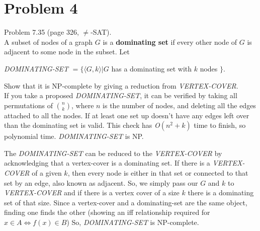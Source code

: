 \documentclass[11pt]{article}
\begin{document}
\newpage





\section*{Problem 4}

Problem 7.35 (page 326, $\neq$-SAT).\\

A subset of nodes of a graph $G$ is a {\bf dominating set} if every other node of $G$ is adjacent to some node in the subset. Let 
\begin{center}
    {\em DOMINATING-SET} $=\{\langle G,k \rangle | G$ has a dominating set with $k$ nodes $\}$.  
\end{center}
Show that it is NP-complete by giving a reduction from {\em VERTEX-COVER}.\\

If you take a proposed {\em DOMINATING-SET}, it can be verified by taking all permutations of ${n \choose k}$, where $n$ is the number of nodes, and deleting all the edges attached to all the nodes. If at least one set up doesn't have any edges left over than the dominating set is valid. This check has {\em O}$(n^2 + k)$ time to finish, so polynomial time. {\em DOMINATING-SET} is NP. 

The {\em DOMINATING-SET} can be reduced to the {\em VERTEX-COVER} by acknowledging that a vertex-cover is a dominating set. If there is a {\em VERTEX-COVER} of a given $k$, then every node is either in that set or connected to that set by an edge, also known as adjacent. So, we simply pass our $G$ and $k$ to {\em VERTEX-COVER} and if there is a vertex cover of a size $k$ there is a dominating set of that size. Since a vertex-cover and a dominating-set are the same object, finding one finds the other (showing an iff relationship required for $x\in A \iff f(x) \in B$) So, {\em DOMINATING-SET} is NP-complete.
\end{document}
